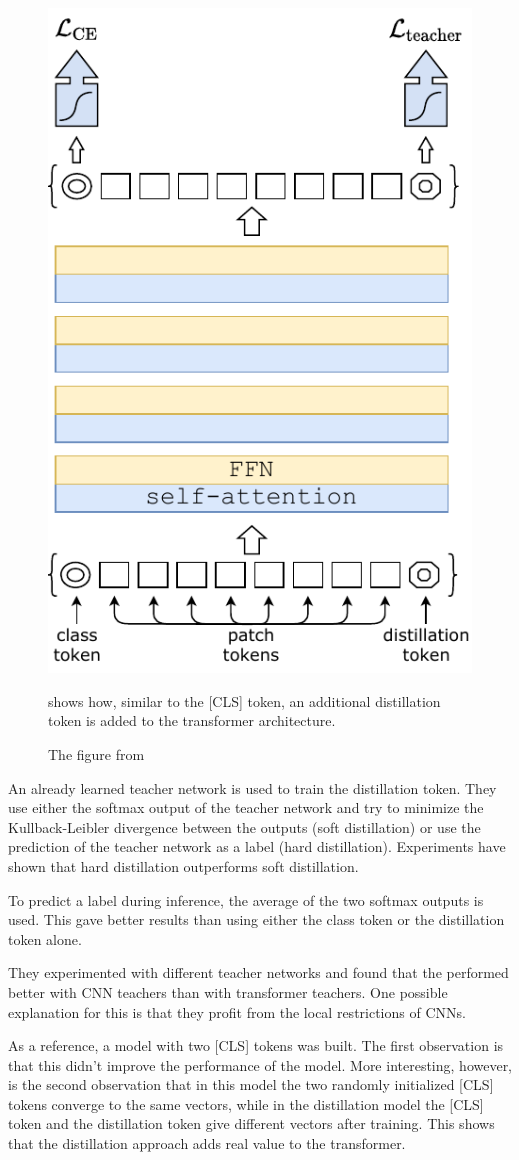 \documentclass[a4paper]{scrartcl}
\begin{document}
    \begin{figure}[btp]
        \centering
        \includegraphics[width=0.5\linewidth]{img/DistillationToken}
        \caption[Distillation Token]{
            The figure from~\cite{touvron2021training}} shows how, similar to the [CLS] token, an additional distillation token is added to the transformer architecture.
        \label{fig:distillation-token}
    \end{figure}

    An already learned teacher network is used to train the distillation token.
    They use either the softmax output of the teacher network and try to minimize the Kullback-Leibler divergence between the outputs (soft distillation) or use the prediction of the teacher network as a label (hard distillation).
    Experiments have shown that hard distillation outperforms soft distillation.

    To predict a label during inference, the average of the two softmax outputs is used.
    This gave better results than using either the class token or the distillation token alone.

    They experimented with different teacher networks and found that the performed better with CNN teachers than with transformer teachers.
    One possible explanation for this is that they profit from the local restrictions of CNNs.

    As a reference, a model with two [CLS] tokens was built.
    The first observation is that this didn't improve the performance of the model.
    More interesting, however, is the second observation that in this model the two randomly initialized [CLS] tokens converge to the same vectors, while in the distillation model the [CLS] token and the distillation token give different vectors after training.
    This shows that the distillation approach adds real value to the transformer.
\end{document}
